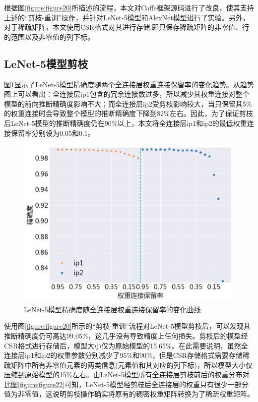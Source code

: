 根据图\ref{figure:figure20}所描述的流程，本文对Caffe框架源码进行了改良，使其支持上述的“剪枝-重训”操作，并针对LeNet-5模型和AlexNet模型进行了实验。另外，对于稀疏矩阵，本文使用CSR格式对其进行存储,即只保存稀疏矩阵的非零值、行的范围以及非零值的列下标。

\subsection{LeNet-5模型剪枝}

图\ref{figure:figure21}显示了LeNet-5模型精确度随两个全连接层权重连接保留率的变化趋势。从趋势图上可以看出：全连接层ip1包含的冗余连接数过多，所以减少其权重连接对整个模型的前向推断精确度影响不大；而全连接层ip2受剪枝影响较大，当只保留其5\%的权重连接时会导致整个模型的推断精确度下降到82\%左右。因此，为了保证剪枝后LeNet-5模型的推断精确度仍在90\%以上，本文将全连接层ip1和ip2的最低权重连接保留率分别设为0.05和0.1。

\begin{figure}[htbp]
    \centering
    \includegraphics[height=0.42\textwidth]{figures/lenet_pruned_threshold.pdf}
    \caption{LeNet-5模型精确度随全连接层权重连接保留率的变化曲线}\label{figure:figure21}
\end{figure}

使用图\ref{figure:figure20}所示的“剪枝-重训”流程对LeNet-5模型剪枝后，可以发现其推断精确度仍可高达99.05\%，这几乎没有导致精度上任何损失。剪枝后的模型经CSR格式进行存储后，模型大小仅为原始模型的15.65\%。在此需要说明，虽然全连接层ip1和ip2的权重参数分别减少了95\%和90\%，但是CSR存储格式需要存储稀疏矩阵中所有非零值元素的两类信息(元素值和其对应的列下标)，所以模型大小仅压缩到原始模型的15\%左右。由LeNet-5模型所有全连接层剪枝前后的权重分布对比图\ref{figure:figure22}可知，LeNet-5模型经剪枝后全连接层的权重只有很少一部分值为非零值，这说明剪枝操作确实将原有的稠密权重矩阵转换为了稀疏权重矩阵。

